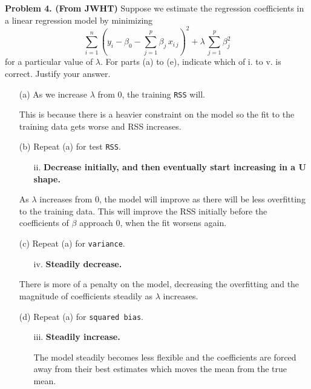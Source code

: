 \documentclass[11pt]{report}
\begin{document}
\newpage
\noindent
{\bf Problem 4. (From JWHT)} Suppose we estimate the regression coefficients in  a linear regression model by minimizing
$$\sum\limits_{i=1}^n \left( y_i-\beta_0-\sum\limits_{j=1}^p\beta_j\,x_{i\,j}\right)^2+\lambda\,\sum\limits_{j=1}^p\beta_j^2$$
for a particular value of $\lambda$. For parts (a) to (e), indicate which of i. to v. is correct. Justify your answer. 
\begin{itemize}
\item[(a) ] As we increase $\lambda$ from 0, the training {\tt RSS} will. 

This is because there is a heavier constraint on the model so the fit to the training data gets worse and RSS increases.

\item[(b) ] Repeat (a) for test {\tt RSS}.
\begin{itemize} 
\item[ii. ] \textbf{Decrease initially, and then eventually start increasing in a U shape.}
\end{itemize}

As $\lambda$ increases from 0, the model will improve as there will be less overfitting to the training data. This will improve the RSS initially before the coefficients of $\beta$ approach 0, when the fit worsens again.

\item[(c) ] Repeat (a) for {\tt variance}.
\begin{itemize}
\item[iv. ] \textbf{Steadily decrease.} 
\end{itemize}

There is more of a penalty on the model, decreasing the overfitting and the magnitude of coefficients steadily as $\lambda$ increases.

\item[(d) ] Repeat (a) for {\tt squared bias}.
\begin{itemize}

\item[iii. ] \textbf{Steadily increase.}
 
The model steadily becomes less flexible and the coefficients are forced away from their best estimates which moves the mean from the true mean.
 
\end{itemize}
\end{itemize}
\end{document}
